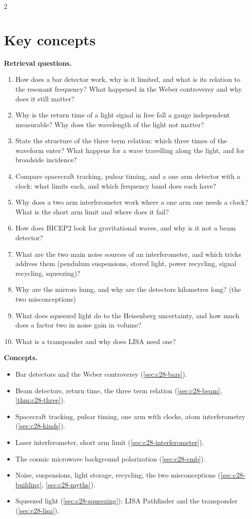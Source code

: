 \begin{paracol}{2}
\section*{Key concepts}
\begin{keyconcepts}
\textbf{Retrieval questions.}
\begin{enumerate}
  \item How does a bar detector work, why is it limited, and what is its relation to the resonant frequency? What happened in the Weber controversy and why does it still matter?
  \item Why is the return time of a light signal in free fall a gauge independent measurable? Why does the wavelength of the light not matter?
  \item State the structure of the three term relation: which three times of the waveform enter? What happens for a wave travelling along the light, and for broadside incidence?
  \item Compare spacecraft tracking, pulsar timing, and a one arm detector with a clock: what limits each, and which frequency band does each have?
  \item Why does a two arm interferometer work where a one arm one needs a clock? What is the short arm limit and where does it fail?
  \item How does BICEP2 look for gravitational waves, and why is it not a beam detector?
  \item What are the two main noise sources of an interferometer, and which tricks address them (pendulum suspensions, stored light, power recycling, signal recycling, squeezing)?
  \item Why are the mirrors hung, and why are the detectors kilometres long? (the two misconceptions)
  \item What does squeezed light do to the Heisenberg uncertainty, and how much does a factor two in noise gain in volume?
  \item What is a transponder and why does LISA need one?
\end{enumerate}
\textbf{Concepts.}
\begin{itemize}
  \item Bar detectors and the Weber controversy (\cref{sec:c28-bars}).
  \item Beam detectors, return time, the three term relation (\cref{sec:c28-beam}, \cref{thm:c28-three}).
  \item Spacecraft tracking, pulsar timing, one arm with clocks, atom interferometry (\cref{sec:c28-kinds}).
  \item Laser interferometer, short arm limit (\cref{sec:c28-interferometer}).
  \item The cosmic microwave background polarization (\cref{sec:c28-cmb}).
  \item Noise, suspensions, light storage, recycling, the two misconceptions (\cref{sec:c28-building}, \cref{sec:c28-myths}).
  \item Squeezed light (\cref{sec:c28-squeezing}); LISA Pathfinder and the transponder (\cref{sec:c28-lisa}).
\end{itemize}
\end{keyconcepts}

\flushside
\end{paracol}
